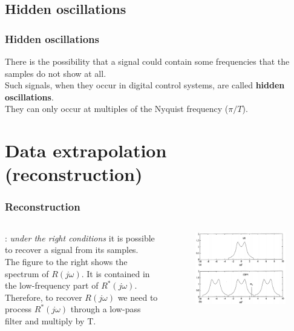 \subsection{Hidden oscillations}

\begin{frame}
	\frametitle{Hidden oscillations}
	\vspace{-15ex}
	There is the possibility that a signal could contain some frequencies that the samples do not show at all. \\
	Such signals, when they occur in digital control systems, are called \textbf{hidden oscillations}. \\
	They can only occur at multiples of the Nyquist frequency ($\pi/T$).
\end{frame}

\section{Data extrapolation (reconstruction)}

\begin{frame}
	\frametitle{Reconstruction}
	\begin{columns}
		\underline{}: \textit{under the right conditions} it is possible to recover a signal from its samples.\\
		\medskip
		The figure to the right shows the spectrum of $R(j\omega)$. It is contained in the low-frequency part of $R^*(j\omega)$. Therefore, to recover $R(j\omega)$ we need to process $R^*(j\omega)$ through a low-pass filter and multiply by T.\\
		\vspace{-4ex}
		\begin{figure}
			\includegraphics[width=1.1\linewidth]{reconstruction}
		\end{figure}
	\end{columns}
\end{frame}

